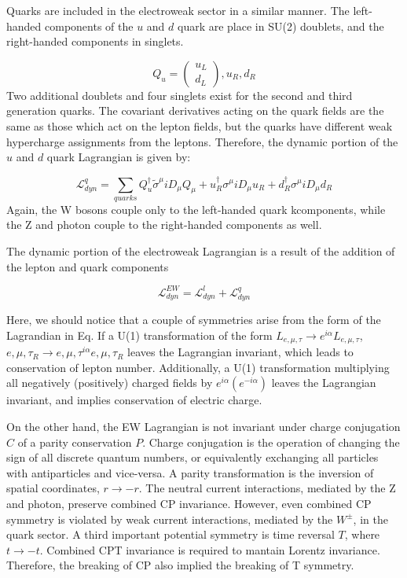 Quarks are included in the electroweak sector in a similar manner. The left-handed components of the $u$ and $d$ quark are place in SU(2) doublets, and the right-handed components in singlets.

\begin{equation}
Q_{u} = \begin{pmatrix}
	u_{L} \\
	d_{L}
\end{pmatrix}, u_{R}, d_{R}
\end{equation}
Two additional doublets and four singlets exist for the second and third generation quarks. The covariant derivatives acting on the quark fields are the same as those which act on the lepton fields, but the quarks have different weak hypercharge assignments from the leptons. Therefore, the dynamic portion of the $u$ and $d$ quark Lagrangian is given by:

\begin{equation}
\mathcal{L}^{q}_{dyn} = \sum_{quarks}Q_{u}^{\dagger}\tilde{\sigma}^{\mu}iD_{\mu}Q_{\mu}+u_{R}^{\dagger}\sigma^{\mu}iD_{\mu}u_{R}+d^{\dagger}_{R}\sigma^{\mu}iD_{\mu}d_{R}
\end{equation}
Again, the W bosons couple only to the left-handed quark kcomponents, while the Z and photon couple to the right-handed components as well.

The dynamic portion of the electroweak Lagrangian is a result of the addition of the lepton and quark components

\begin{equation}
\mathcal{L}^{EW}_{dyn} = \mathcal{L}^{l}_{dyn} + \mathcal{L}_{dyn}^{q}
\end{equation}

Here, we should notice that a couple of symmetries arise from the form of the Lagrandian in Eq. If a U(1) transformation of the form $L_{e,\mu,\tau}\rightarrow e^{i\alpha}L_{e,\mu,\tau}$, $e,\mu,\tau_{R}\rightarrow e,\mu,\tau^{i\alpha}e,\mu,\tau_{R}$ leaves the Lagrangian invariant, which leads to conservation of lepton number. Additionally, a U(1) transformation multiplying all negatively (positively) charged fields by $e^{i\alpha}(e^{-i\alpha})$ leaves the Lagrangian invariant, and implies conservation of electric charge.

On the other hand, the EW Lagrangian is not invariant under charge conjugation $C$ of a parity conservation $P$. Charge conjugation is the operation of changing the sign of all discrete quantum numbers, or equivalently exchanging all particles with antiparticles and vice-versa. A parity transformation is the inversion of spatial coordinates, $r\rightarrow -r$. The neutral current interactions, mediated by the Z and photon, preserve combined CP invariance. However, even combined CP symmetry is violated by weak current interactions, mediated by the $W^{\pm}$, in the quark sector. A third important potential symmetry is time reversal $T$, where $t\rightarrow -t$. Combined CPT invariance is required to mantain Lorentz invariance. Therefore, the breaking of CP also implied the breaking of T symmetry.

